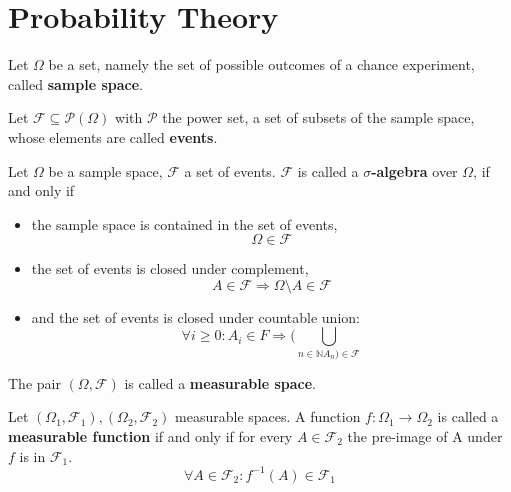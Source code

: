     \section{Probability Theory}\label{\positionnumber}
        \begin{definition}
        Let $\Omega$ be a set, namely the set of possible outcomes of a chance experiment, called \textbf{sample space}.
        
        Let $\mathcal{F} \subseteq \mathcal{P}(\Omega)$ with $\mathcal{P}$ the power set, a set of subsets of the sample space, whose elements are called \textbf{events}.
        
        Let $\Omega$ be a sample space, $\mathcal{F}$ a set of events.
        $\mathcal{F}$ is called a \textbf{$\sigma$-algebra} over $\Omega$, if and only if
        \begin{itemize}
        \item the sample space is contained in the set of events,
        \[ \Omega \in \mathcal{F} \]
        \item the set of events is closed under complement,
        \[ A \in \mathcal{F} \Rightarrow \Omega \setminus A \in \mathcal F \]
        \item and the set of events is closed under countable union:
        \[ \forall i \geq 0: A_i \in F \Rightarrow (\bigcup_{n \in \mathbb{N} A_n) \in \mathcal{F}} \]
        \end{itemize}
        
        The pair $\left( \Omega, \mathcal{F} \right)$ is called a \textbf{measurable space}.

        Let $\left( \Omega_1, \mathcal{F}_1 \right), \left( \Omega_2, \mathcal{F}_2 \right)$ measurable spaces. A function $f: \Omega_1 \rightarrow \Omega_2$ is called a \textbf{measurable function} if and only if for every $A \in \mathcal{F}_2$ the pre-image of A under $f$ is in $\mathcal{F}_1$.
        \[ \forall A \in \mathcal{F}_2: f^{-1}(A) \in \mathcal{F}_1 \]
        \end{definition}

        \begin{definition}
            
        \end{definition}

        \begin{definition}
            
        \end{definition}
            
